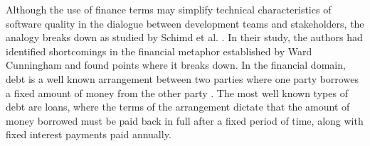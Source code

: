 \documentclass{mprop}
\begin{document}
Although the use of finance terms may simplify technical characteristics of software quality in the dialogue between development teams and stakeholders, the analogy breaks down as studied by Schimd et al. \cite{Schmid2013}.
In their study, the authors had identified shortcomings in the financial metaphor established by Ward Cunningham \cite{Cunningham1993} and found points where it breaks down.
In the financial domain, debt is a well known arrangement between two parties where one party borrowes a fixed amount of money from the other party \cite{debt-investopedia}.
The most well known types of debt are loans, where the terms of the arrangement dictate that the amount of money borrowed must be paid back in full after a fixed period of time, along with fixed interest payments paid annually.
\end{document}
